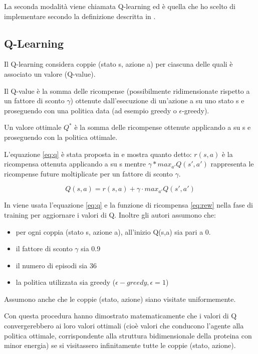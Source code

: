 \documentclass[conference]{IEEEtran}
\begin{document}
La seconda modalità viene chiamata Q-learning ed è quella che ho scelto di implementare secondo la definizione descritta in \cite{CzibulaPFP}.

\subsection{Q-Learning}

Il Q-learning considera coppie (stato s, azione a) per ciascuna delle quali è associato un valore (Q-value).

Il Q-value è la somma delle ricompense (possibilmente ridimensionate rispetto a un fattore di sconto $\gamma$) ottenute dall'esecuzione di un'azione a su uno stato s e proseguendo con una politica data (ad esempio greedy o $\epsilon$-greedy).

Un valore ottimale $Q^*$ è la somma delle ricompense ottenute applicando a su s e proseguendo con la politica ottimale.

L'equazione \ref{eq:q} è stata proposta in \cite{CzibulaPFP} e mostra quanto detto: $r(s,a)$ è la ricompensa ottenuta applicando a su s mentre $\gamma * max_{a'} Q(s', a')$ rappresenta le ricompense future moltiplicate per un fattore di sconto $\gamma$.

\begin{equation}
\label{eq:q}
Q(s,a) = r(s,a) + \gamma \cdot max_{a'} Q(s', a')
\end{equation}

In \cite{CzibulaPFP} viene usata l'equazione \ref{eq:q} e la funzione di ricompensa \ref{eq:rew} nella fase di training per aggiornare i valori di Q. Inoltre gli autori assumono che:

\begin{itemize}
 \item per ogni coppia (stato s, azione a), all'inizio Q(s,a) sia pari a 0.
 \item il fattore di sconto $\gamma$ sia 0.9
 \item il numero di episodi sia 36
 \item la politica utilizzata sia greedy ($\epsilon-greedy, \epsilon = 1$)
\end{itemize}

Assumono anche che le coppie (stato, azione) siano visitate uniformemente.

Con questa procedura hanno dimostrato matematicamente che i valori di Q convergerebbero ai loro valori ottimali (cioè valori che conducono l'agente alla politica ottimale, corrispondente alla struttura bidimensionale della proteina con minor energia) se si visitassero infinitamente tutte le coppie (stato, azione).
\end{document}
